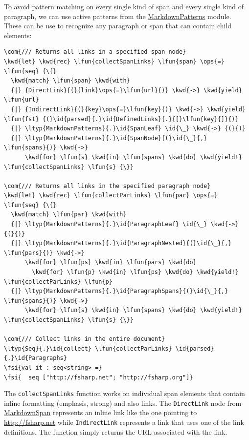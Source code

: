 \documentclass{article}
\newcommand{\id}[1]{\textcolor{black}{#1}}
\newcommand{\com}[1]{\textcolor{officegreen}{#1}}
\newcommand{\kwd}[1]{\textcolor{navy}{#1}}
\newcommand{\ops}[1]{\textcolor{purple}{#1}}
\newcommand{\fsi}[1]{\textcolor{outputcolor}{#1}}
\begin{document}
To avoid pattern matching on every single kind of span and every single kind of
paragraph, we can use active patterns from the \href{https://fsprojects.github.io/FSharp.Formatting/reference/fsharp-formatting-markdown-markdownpatterns.html}{MarkdownPatterns} module. These can be use
to recognize any paragraph or span that can contain child elements:
\begin{Verbatim}[commandchars=\\\{\}]
\com{/// Returns all links in a specified span node}
\kwd{let} \kwd{rec} \lfun{collectSpanLinks} \lfun{span} \ops{=} \lfun{seq} {\{}
  \kwd{match} \lfun{span} \kwd{with}
  {|} {DirectLink}{(}{link}\ops{=}\lfun{url}{)} \kwd{->} \kwd{yield} \lfun{url}
  {|} {IndirectLink}{(}{key}\ops{=}\lfun{key}{)} \kwd{->} \kwd{yield} \lfun{fst} {(}\id{parsed}{.}\id{DefinedLinks}{.}{[}\lfun{key}{]}{)}
  {|} \ltyp{MarkdownPatterns}{.}\id{SpanLeaf} \id{\_} \kwd{->} {(}{)}
  {|} \ltyp{MarkdownPatterns}{.}\id{SpanNode}{(}\id{\_}{,} \lfun{spans}{)} \kwd{->}
      \kwd{for} \lfun{s} \kwd{in} \lfun{spans} \kwd{do} \kwd{yield!} \lfun{collectSpanLinks} \lfun{s} {\}}

\com{/// Returns all links in the specified paragraph node}
\kwd{let} \kwd{rec} \lfun{collectParLinks} \lfun{par} \ops{=} \lfun{seq} {\{}
  \kwd{match} \lfun{par} \kwd{with}
  {|} \ltyp{MarkdownPatterns}{.}\id{ParagraphLeaf} \id{\_} \kwd{->} {(}{)}
  {|} \ltyp{MarkdownPatterns}{.}\id{ParagraphNested}{(}\id{\_}{,} \lfun{pars}{)} \kwd{->}
      \kwd{for} \lfun{ps} \kwd{in} \lfun{pars} \kwd{do}
        \kwd{for} \lfun{p} \kwd{in} \lfun{ps} \kwd{do} \kwd{yield!} \lfun{collectParLinks} \lfun{p}
  {|} \ltyp{MarkdownPatterns}{.}\id{ParagraphSpans}{(}\id{\_}{,} \lfun{spans}{)} \kwd{->}
      \kwd{for} \lfun{s} \kwd{in} \lfun{spans} \kwd{do} \kwd{yield!} \lfun{collectSpanLinks} \lfun{s} {\}}

\com{/// Collect links in the entire document}
\ltyp{Seq}{.}\id{collect} \lfun{collectParLinks} \id{parsed}{.}\id{Paragraphs}
\fsi{val it : seq<string> =}
\fsi{  seq ["http://fsharp.net"; "http://fsharp.org"]}
\end{Verbatim}



The \texttt{collectSpanLinks} function works on individual span elements that contain inline
formatting (emphasis, strong) and also links. The \texttt{DirectLink} node from \href{https://fsprojects.github.io/FSharp.Formatting/reference/fsharp-formatting-markdown-markdownspan.html}{MarkdownSpan} represents an inline
link like the one pointing to \href{http://fsharp.net}{http://fsharp.net} while \texttt{IndirectLink} represents a
link that uses one of the link definitions. The function simply returns the URL associated
with the link.
\end{document}

